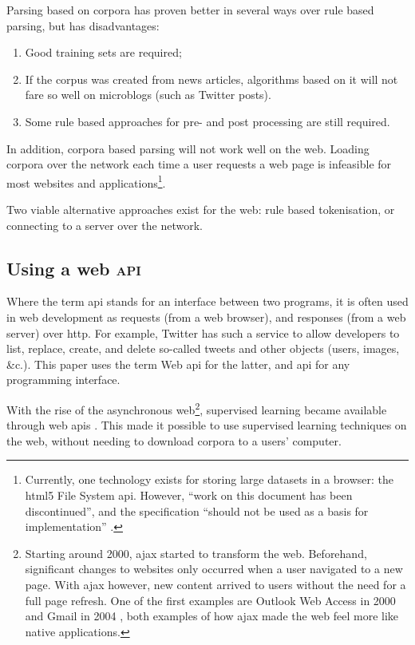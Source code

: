 Parsing based on corpora has proven better in several ways over rule based
  parsing, but has disadvantages:

\begin{enumerate}
\item Good training sets are required;
\item If the corpus was created from news articles, algorithms based on it
  will not fare so well on microblogs (such as Twitter posts).
\item Some rule based approaches for pre- and post processing are still
  required.
\end{enumerate}

\noindent In addition, corpora based parsing will not work well on the web.
Loading corpora over the network each time a user requests a web page is
  infeasible for most websites and applications\footnote{Currently,
    one technology exists for storing large datasets in a browser: the
    \acrshort{html5} File System \acrshort{api}. However, ``work on this
    document has been discontinued'', and the specification ``should not be
    used as a basis for implementation'' \autocite{urhane-file-api}.}.

Two viable alternative approaches exist for the web: rule based tokenisation,
  or connecting to a server over the network.

\subsection{Using a web \textsc{api}}\label{using-a-web}

Where the term \gls{api} stands for an interface between two programs,
  it is often used in web development as requests (from a web browser),
  and responses (from a web server) over \gls{http}.
For example, Twitter has such a service to allow developers to list,
  replace, create, and delete so-called tweets and other objects (users,
  images, \&c.).
This paper uses the term Web \gls{api} for the latter, and \gls{api} for
any programming interface.

With the rise of the asynchronous web\footnote{Starting around 2000,
    \gls{ajax} started to transform the web.
  Beforehand, significant changes to websites only occurred when a user
    navigated to a new page. 
  With \gls{ajax} however, new content arrived to users without the need
    for a full page refresh. One of the first examples are Outlook Web
    Access in 2000 \autocite{technet-outlook-web-access} and Gmail in 2004
    \autocite{gmailblog-gmail-ajax}, both examples of how \gls{ajax} made
    the web feel more like native applications.},
  supervised learning became available through web \glspl{api}
  \autocites{textteaser-web-api}{wordnet-web-api}{textrazor-web-api}.
This made it possible to use supervised learning techniques on the web,
  without needing to download corpora to a users' computer.

